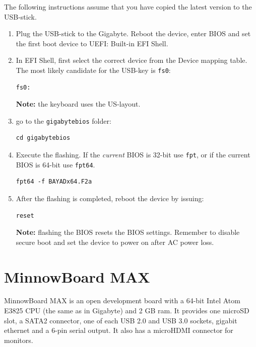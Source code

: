 \documentclass[a4paper,11pt]{article}
\newcommand{\note}{\textbf{Note: }}
\newcommand{\cmd}[1]{\texttt{#1}}
\begin{document}
The following instructions assume that you have copied the latest version to the USB-stick.

\begin{enumerate}

\item Plug the USB-stick to the Gigabyte. Reboot the device, enter BIOS and set the first boot device to UEFI: Built-in EFI Shell.

\item In EFI Shell, first select the correct device from the Device mapping table. The most likely candidate for the USB-key is \cmd{fs0}:
\begin{lstlisting}
fs0:
\end{lstlisting}
\note the keyboard uses the US-layout.

\item go to the \cmd{gigabytebios} folder:

\begin{lstlisting}
cd gigabytebios
\end{lstlisting}

\item Execute the flashing. If the \textit{current} BIOS is 32-bit use \cmd{fpt}, or if the current BIOS is 64-bit use \cmd{fpt64}.

\begin{lstlisting}
fpt64 -f BAYADx64.F2a
\end{lstlisting}

\item After the flashing is completed, reboot the device by issuing:
\begin{lstlisting}
reset
\end{lstlisting}
\note flashing the BIOS resets the BIOS settings. Remember to disable secure boot and set the device to power on after AC power loss.

\end{enumerate}


\section{MinnowBoard MAX}
\label{minnowboard}

MinnowBoard MAX is an open development board with a 64-bit Intel Atom E3825 CPU (the same as in Gigabyte) and 2 GB ram. It provides one microSD slot, a SATA2 connector, one of each USB 2.0 and USB 3.0 sockets, gigabit ethernet and a 6-pin serial output. It also has a microHDMI connector for monitors.
\end{document}
